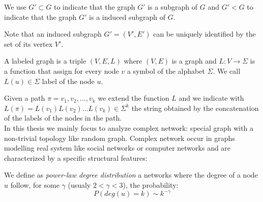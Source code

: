We use $G' \subset G$ to indicate that the graph $G'$ is a subgraph of $G$ and $G' < G$ to indicate that the graph $G'$ is a induced subgraph of $G$.

Note that an induced subgraph $G' = (V', E')$ can be uniquely identified by the set of its vertex $V'$.\\

\begin{definizione}\label{def:labeledgraph}
	A labeled graph is a triple $(V,E,L)$ where $(V,E)$ is a graph and $L : V \rightarrow \Sigma$
	is a function that assign for every node $v$ a symbol of the alphabet $\Sigma$. We call $L(u) \in \Sigma$ label of the node $u$.
\end{definizione}

Given a path $\pi = v_{1}, v_{2}, \ldots, v_{k}$ we extend the function $L$ and we indicate with $L(\pi) = L(v_{1}) L(v_{2}) \ldots L(v_{k}) \in \Sigma^{k}$ the string obtained by the concatenation of the labels of the nodes in the path.\\

In this thesis we mainly focus to analyze complex network: special graph with a non-trivial topology like random graph. Complex network occur in graphs modelling real system like social networks or computer networks and are characterized by a specific structural features:

\begin{definizione}\label{def:power-law-graph}
	We define as \textit{power-law degree distribution} a networks where the degree of a node $u$ follow, for some $\gamma$ (usualy $2 < \gamma < 3$), the probability:
	\begin{equation}
		P(deg(u) = k) \sim k^{-\gamma}  
	\end{equation}
\end{definizione}

